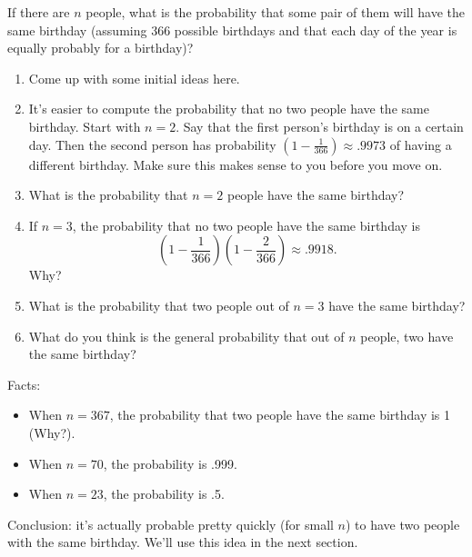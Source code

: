 \documentclass[12pt]{amsart}
\theoremstyle{plain}
\theoremstyle{definition}
\theoremstyle{remark}
\begin{document}
If there are $n$ people, what is the probability that some pair of them will have the same birthday (assuming 366 possible birthdays and that each day of the year is equally probably for a birthday)?\\

\begin{enumerate}[1.]
	\item Come up with some initial ideas here.\\
	\newpage \item It's easier to compute the probability that no two people have the same birthday.  Start with $n = 2$.  Say that the first person's birthday is on a certain day.  Then the second person has probability $(1-\frac{1}{366}) \approx .9973$ of having a different birthday.  Make sure this makes sense to you before you move on.\\ \vspace{.5in}
	\item What is the probability that $n = 2$ people have the same birthday?\\ \vspace{.5in}
	\item If $n = 3$, the probability that no two people have the same birthday is $$(1-\frac{1}{366})(1-\frac{2}{366}) \approx .9918.$$  Why?\\ \vspace{.5in}
	\item What is the probability that two people out of $n = 3$ have the same birthday?\\ \vspace{.5in}
	\item What do you think is the general probability that out of $n$ people, two have the same birthday?\\ \vspace{.5in}
\end{enumerate}

Facts:
\begin{itemize}
	\item When $n = 367$, the probability that two people have the same birthday is 1 (Why?).
	\item When $n = 70$, the probability is .999.
	\item When $n = 23$, the probability is .5.
\end{itemize}

\begin{framed}
\noindent Conclusion: it's actually probable pretty quickly (for small $n$) to have two people with the same birthday.  We'll use this idea in the next section.
\end{framed}
\end{document}
